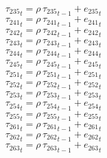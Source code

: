 \begin{dmath}
{{\tau_{235}}}_{t}={{\rho}}\, {{\tau_{235}}}_{t-1}+{{e_{235}}}_{t}
\end{dmath}
\begin{dmath}
{{\tau_{241}}}_{t}={{\rho}}\, {{\tau_{241}}}_{t-1}+{{e_{241}}}_{t}
\end{dmath}
\begin{dmath}
{{\tau_{242}}}_{t}={{\rho}}\, {{\tau_{242}}}_{t-1}+{{e_{242}}}_{t}
\end{dmath}
\begin{dmath}
{{\tau_{243}}}_{t}={{\rho}}\, {{\tau_{243}}}_{t-1}+{{e_{243}}}_{t}
\end{dmath}
\begin{dmath}
{{\tau_{244}}}_{t}={{\rho}}\, {{\tau_{244}}}_{t-1}+{{e_{244}}}_{t}
\end{dmath}
\begin{dmath}
{{\tau_{245}}}_{t}={{\rho}}\, {{\tau_{245}}}_{t-1}+{{e_{245}}}_{t}
\end{dmath}
\begin{dmath}
{{\tau_{251}}}_{t}={{\rho}}\, {{\tau_{251}}}_{t-1}+{{e_{251}}}_{t}
\end{dmath}
\begin{dmath}
{{\tau_{252}}}_{t}={{\rho}}\, {{\tau_{252}}}_{t-1}+{{e_{252}}}_{t}
\end{dmath}
\begin{dmath}
{{\tau_{253}}}_{t}={{\rho}}\, {{\tau_{253}}}_{t-1}+{{e_{253}}}_{t}
\end{dmath}
\begin{dmath}
{{\tau_{254}}}_{t}={{\rho}}\, {{\tau_{254}}}_{t-1}+{{e_{254}}}_{t}
\end{dmath}
\begin{dmath}
{{\tau_{255}}}_{t}={{\rho}}\, {{\tau_{255}}}_{t-1}+{{e_{255}}}_{t}
\end{dmath}
\begin{dmath}
{{\tau_{261}}}_{t}={{\rho}}\, {{\tau_{261}}}_{t-1}+{{e_{261}}}_{t}
\end{dmath}
\begin{dmath}
{{\tau_{262}}}_{t}={{\rho}}\, {{\tau_{262}}}_{t-1}+{{e_{262}}}_{t}
\end{dmath}
\begin{dmath}
{{\tau_{263}}}_{t}={{\rho}}\, {{\tau_{263}}}_{t-1}+{{e_{263}}}_{t}
\end{dmath}
